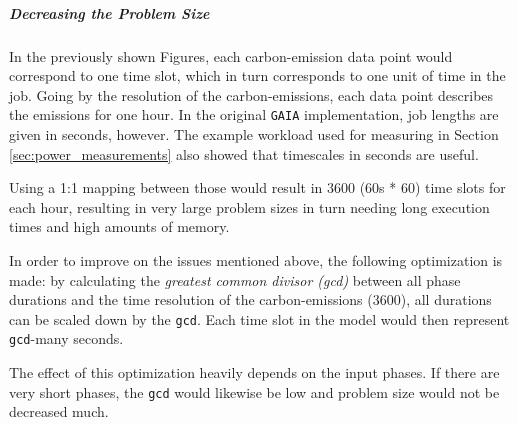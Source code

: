 \subparagraph{Decreasing the Problem Size}

In the previously shown Figures, each carbon-emission data point would correspond to one time slot, which in turn corresponds to one unit of time in the job. 
Going by the resolution of the carbon-emissions, each data point describes the emissions for one hour. 
In the original \verb|GAIA| implementation, job lengths are given in seconds, however. 
The example workload used for measuring in Section \ref{sec:power_measurements} also showed that timescales in seconds are useful. 

Using a 1:1 mapping between those would result in 3600 (60s * 60) time slots for each hour, resulting in very large problem sizes in turn needing long execution times and high amounts of memory.

In order to improve on the issues mentioned above, the following optimization is made: by calculating the \emph{greatest common divisor (gcd)} between all phase durations and the time resolution of the carbon-emissions (3600), all durations can be scaled down by the \verb|gcd|. Each time slot in the model would then represent \verb|gcd|-many seconds.

The effect of this optimization heavily depends on the input phases. 
If there are very short phases, the \verb|gcd| would likewise be low and problem size would not be decreased much. 

